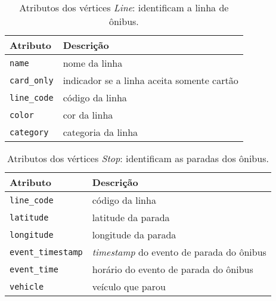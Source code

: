 \begin{table}[!htb]
    \caption{Atributos dos vértices \emph{Line}: identificam a linha de ônibus.}
    \label{tab:vertice_line}
    \centering
    \footnotesize
    \begin{tabular}{p{2.5cm}p{6cm}} 
    \hline
    Atributo & Descrição\\
    \hline
    \texttt{name}              & nome da linha \\
    \texttt{card\_only}        & indicador se a linha aceita somente cartão \\
    \texttt{line\_code}        & código da linha \\
    \texttt{color}             & cor da linha \\
    \texttt{category}          & categoria da linha \\
    \hline
    \end{tabular}
\end{table}



\begin{table}[!htb]
    \caption{Atributos dos vértices \emph{Stop}: identificam as paradas dos ônibus.}
    \label{tab:vertice_stop}
    \centering
    \footnotesize
    \begin{tabular}{p{3cm}p{6cm}} 
        \hline
        Atributo & Descrição\\
        \hline
        \texttt{line\_code} & código da linha \\
        \texttt{latitude} & latitude da parada  \\
        \texttt{longitude} & longitude da parada  \\
        \texttt{event\_timestamp} & \emph{timestamp} do evento de parada do ônibus  \\
        \texttt{event\_time} & horário do evento de parada do ônibus \\
        \texttt{vehicle} & veículo que parou \\
        \hline  
    \end{tabular}
\end{table}

